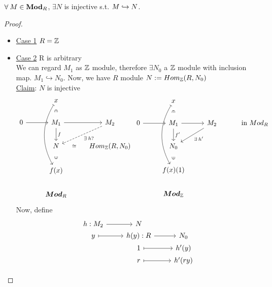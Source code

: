 \begin{theorem}
 $\forall M \in \Mod_R$, $\exists N$ is injective s.t. $M \toone N$.
 \begin{proof} $ $
   \begin{itemize}
      \item \underline{Case 1} $R = \Zb$ \\
      \item \underline{Case 2} R is arbitrary \\
        We can regard $M_1$ as $\Zb$ module, therefore $\exists N_0$ a 
        $\Zb$ module with inclusion map. $M_1 \hookrightarrow N_0$. 
        Now, we have $R$ module $N := Hom_\Zb(R, N_0)$ \\
        \underline{Claim}: $N$ is injective
        $$
          \begin{tikzcd}[contains/.style = {draw=none, 
          "\in" description ,sloped}]
                      & x \ar[d, contains] \ar[ddd, mapsto, bend right] \\
            0 \ar[r]  & M_1 \ar[r] \ar[d, "f"] & M_2 \ar[ld, 
            "\exists h ?",dashed] \\
                      & N \ar[r, draw=none, "\cong" description]&  
                      Hom_\Zb(R, N_0) \\
                      & f(x) \ar[u, contains] \\
                      & \boldsymbol{Mod}_R
          \end{tikzcd} 
          \begin{tikzcd}[contains/.style = {draw=none, 
          "\in" description ,sloped}]
                      & x \ar[d, contains] \ar[ddd, mapsto, bend right] \\
            0 \ar[r]  & M_1 \ar[r] \ar[d, "f'"] & M_2 \ar[ld, 
            "\exists h'"] & \text{ in } Mod_R\\
                      & N_0 \\
                      & f(x)(1) \ar[u, contains] \\
                      & \boldsymbol{Mod}_\Zb
        \end{tikzcd}
        $$
        Now, define
        $$
        \begin{tikzcd}[row sep=0.1]
          h: M_2 \ar[r] & N \\
          y \ar[r, mapsto] & h(y) : R \ar[r] & N_0 \\ 
                           & 1 \ar[r, mapsto] & h'(y) \\
                           & r \ar[r, mapsto] & h'(ry) \\

\end{tikzcd}$$
\end{itemize}
\end{proof}
\end{theorem}
